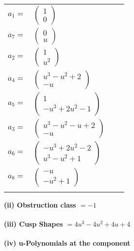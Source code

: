\documentclass[1p]{elsarticle_modified}
\theoremstyle{definition}
\begin{document}
\begin{tabular}{m{7pt} m{180pt} m{7pt} m{180pt} }
\flushright $a_{1}=$&$\begin{pmatrix}1\\0\end{pmatrix}$ \\
\flushright $a_{7}=$&$\begin{pmatrix}0\\u\end{pmatrix}$ \\
\flushright $a_{2}=$&$\begin{pmatrix}1\\u^2\end{pmatrix}$ \\
\flushright $a_{4}=$&$\begin{pmatrix}u^3- u^2+2\\- u\end{pmatrix}$ \\
\flushright $a_{5}=$&$\begin{pmatrix}1\\- u^3+2 u^2-1\end{pmatrix}$ \\
\flushright $a_{3}=$&$\begin{pmatrix}u^3- u^2- u+2\\- u\end{pmatrix}$ \\
\flushright $a_{6}=$&$\begin{pmatrix}- u^3+2 u^2-2\\u^3- u^2+1\end{pmatrix}$ \\
\flushright $a_{8}=$&$\begin{pmatrix}- u\\- u^2+1\end{pmatrix}$\\&\end{tabular}
\flushleft \textbf{(ii) Obstruction class $= -1$}\\~\\
\flushleft \textbf{(iii) Cusp Shapes $= 4 u^3-4 u^2+4 u+4$}\\~\\
\newpage\renewcommand{\arraystretch}{1}
\flushleft \textbf{(iv) u-Polynomials at the component}\newline \\
\end{document}
